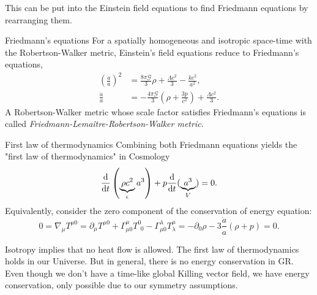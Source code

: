 This can be put into the Einstein field equations to find Friedmann equations by rearranging them.
\begin{mybox}{Friedmann's equations}
	For a spatially homogeneous and isotropic space-time with the
	Robertson-Walker metric, Einstein’s field equations reduce
	to Friedmann’s equations,
	\begin{align}
		\left(\frac{\dot{a}}{a}\right)^2 &=\frac{8 \pi \mathcal{G}}{3} \rho + \frac{\Lambda c^2}{3}- \frac{k c^2}{a^2}, \\
		\frac{\ddot{a}}{a} &= - \frac{4 \pi \mathcal{G}}{3} \left(\rho + \frac{3 p}{c^2}\right) + \frac{\Lambda c^2}{3}.
	\end{align}
	A Robertson-Walker metric whose scale factor satisfies Friedmann’s
	equations is called \emph{Friedmann-Lemaître-Robertson-Walker metric}.
	
\end{mybox}

\begin{mybox}{First law of thermodynamics}
	Combining both Friedmann equations yields the "first law of thermodynamics" in Cosmology
	\begin{equation}
	\frac{\mathrm{d}}{\mathrm{d} t} \left(\underbrace{\rho c^2}_{\epsilon} a^3\right) + p \frac{\mathrm{d}}{\mathrm{d} t} (\underbrace{a^3}_{V}) = 0.
	\end{equation}
	Equivalently, consider the zero component of the conservation of energy equation:
	\begin{equation}
	0 = \nabla_\mu T^{\mu 0} = \partial_\mu T^{\mu 0} + \Gamma^\mu_{\mu 0} T^0_{\;\,0} - \Gamma^\lambda_{\mu 0} T^\mu_{\lambda}= - \partial_0 \rho - 3 \frac{\dot{a}}{a} (\rho + p) = 0.
	\end{equation}
	
	Isotropy implies that no heat flow is allowed. The first law of thermodynamics holds in our Universe. But in general, there is no energy conservation in GR. Even though we don't have a time-like global Killing vector field, we have energy conservation, only possible due to our symmetry assumptions.
\end{mybox}
